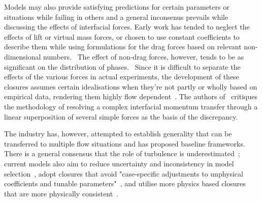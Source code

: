 Models may also provide satisfying predictions for certain parameters or situations while
 failing in others and a general inconsenus prevails while discussing the effects of interfacial
 forces. Early work has tended to neglect 
 the effects of lift or virtual mass forces, or chosen to use constant coefficients to 
 describe them while using formulations for the drag forces based on 
 relevant non-dimensional numbers.~\cite{liaoEulerianModellingTurbulent2018}
 The effect of non-drag forces, however, tends to be as significant on the 
 distribution of phases.~
 Since it is 
 difficult to separate the effects of the various forces in actual experiments,
 the development of these closures assumes certain idealisations when they're not
 partly or wholly based on empirical data, rendering them highly flow 
 dependent~. The authors 
 of~ critiques the methodology of resolving a 
 complex interfacial momentum transfer through a linear superposition 
 of several simple forces as the basis of the discrepancy.
 
The industry has, however, attempted to establish generality that can be transferred 
 to multiple flow situations and has proposed baseline frameworks. There is a general consensus
 that the role of turbulence is underestimated~\cite{colomboBenchmarkingCFDModelling};
 current models also aim to reduce 
 uncertainty and inconsistency in model selection~\cite{colomboBenchmarkingCFDModelling}, 
 adopt closures that avoid "case-specific adjustments to unphysical coefficients and 
 tunable parameters"~\cite{sugrueRobustMomentumClosure}, and utilise more
 physics based closures that are more physically consistent~\cite{liaoEulerianModellingTurbulent2018,colomboBenchmarkingCFDModelling}.

